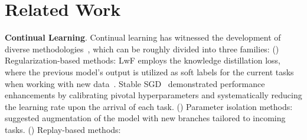 \section{Related Work}
\vspace{-.2cm}
\textbf{Continual Learning}. 
Continual learning has witnessed the development of diverse methodologies~\citep{DBLP:journals/pami/LangeAMPJLST22}, which can be roughly divided into three families:
() Regularization-based methods: LwF employs the knowledge distillation loss, where the previous model's output is utilized as soft labels for the current tasks when working with new data~\citep{DBLP:conf/eccv/LiH16}.
Stable SGD~\citep{DBLP:conf/nips/MirzadehFPG20} demonstrated performance enhancements by calibrating pivotal hyperparameters and systematically reducing the learning rate upon the arrival of each task.
() Parameter isolation methods: \cite{DBLP:journals/corr/RusuRDSKKPH16} suggested augmentation of the model with new branches tailored to incoming tasks.
() Replay-based methods: 
